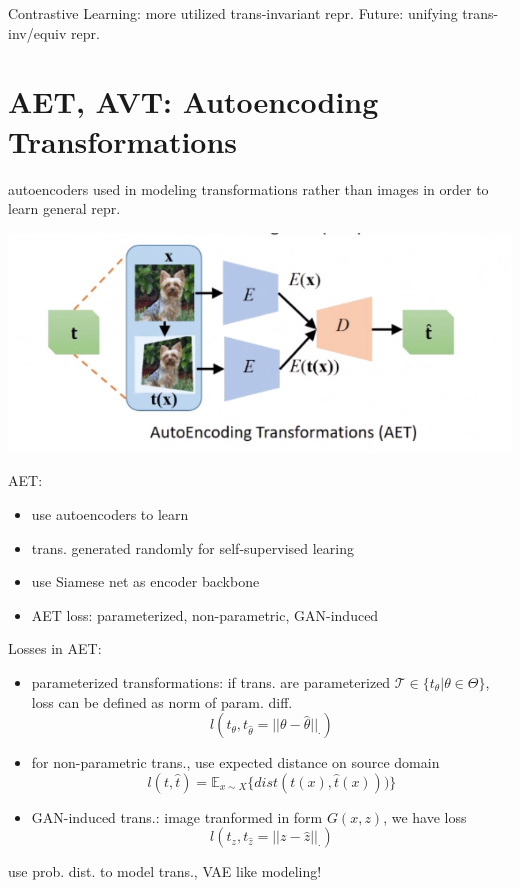 \documentclass{article}
\begin{document}
    Contrastive Learning: more utilized trans-invariant repr.
    Future: unifying trans-inv/equiv repr.

\section{AET, AVT: Autoencoding Transformations}

     autoencoders used in modeling transformations rather than images in order to learn general repr.

    \centerline{\includegraphics[width=0.8\paperwidth]{aet.PNG}}
    AET:\begin{itemize}
        \item use autoencoders to learn 
        \item trans. generated randomly for self-supervised learing
        \item use Siamese net as encoder backbone
        \item AET loss: parameterized, non-parametric, GAN-induced
    \end{itemize}
    Losses in AET:
    \begin{itemize}
        \item parameterized transformations: if trans. are parameterized $\mathcal T \in \{t_\theta | \theta \in \Theta\}$, loss can be defined as norm of param. diff. 
        $$l(t_\theta, t_{\hat \theta}=||\theta - \hat \theta||_{\cdot})$$
        \item for non-parametric trans., use expected distance on source domain 
        $$l(t, \hat t)=\mathbb E_{x\sim X}\{dist(t(x), \hat t(x)))\}$$
        \item GAN-induced trans.: image tranformed in form $G(x, z)$, we have loss 
        $$l(t_z, t_{\hat z}=||z-\hat z||_\cdot)$$
    \end{itemize}

     use prob. dist. to model trans., VAE like modeling!
    
\end{document}
